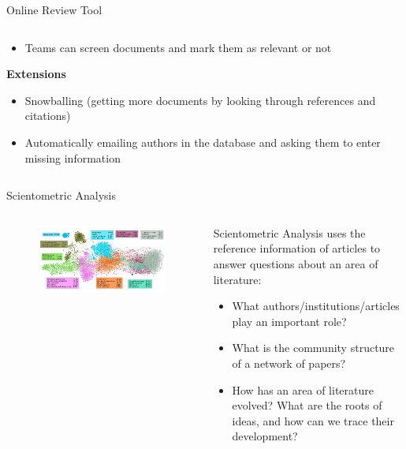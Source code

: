 \documentclass[9pt]{beamer}
\begin{document}
\begin{frame}{Online Review Tool}
\begin{columns}
\begin{column}{0.5\linewidth}
\begin{center}
\begin{itemize}
				\item Teams can screen documents and mark them as relevant or not
			\end{itemize}
		\medskip
		\textbf{Extensions}
		\begin{itemize}
			\item Snowballing (getting more documents by looking through references and citations)
			\item Automatically emailing authors in the database and asking them to enter missing information
		\end{itemize}
		\end{center}
	\end{column}
\end{columns}

\end{frame}

\begin{frame}{Scientometric Analysis}

\begin{columns}
	\begin{column}{0.5\linewidth}
		\begin{center}
			\begin{figure}
				\includegraphics[width=1\linewidth]{images/network.png}
			\end{figure}
		\end{center}
	\end{column}
	\begin{column}{0.5\linewidth}
		\begin{center}
			Scientometric Analysis uses the reference information of articles to answer questions about an area of literature:
			\begin{itemize}
				\item What authors/institutions/articles play an important role?
				\item What is the community structure of a network of papers?
				\item How has an area of literature evolved? What are the roots of ideas, and how can we trace their development?
			\end{itemize}
		\end{center}
	\end{column}
\end{columns}

\end{frame}
\end{document}
